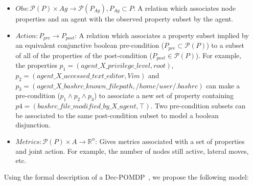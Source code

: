 \documentclass[conference]{IEEEtran}
\begin{document}
\begin{itemize}
    \item $Obs: \mathcal{P}(P) \times Ag \rightarrow \mathcal{P}(P_{Ag}), P_{Ag} \subset P$: A relation which associates node properties and an agent with the observed property subset by the agent.

    \item $Action: P_{pre} \rightarrow P_{post}$: A relation which associates a property subset implied by an equivalent conjunctive boolean pre-condition ($P_{pre} \subset \mathcal{P}(P)$) to a subset of all of the properties of the post-condition ($P_{post} \in \mathcal{P}(P)$). For example, the properties $p_1 = (agent\_X\_privilege\_level, \allowbreak root)$, $p_2 = (agent\_X\_accessed\_text\_editor, \allowbreak Vim)$ and $p_3 = (agent\_X\_bashrc\_known\_filepath, \allowbreak /home/user/.bashrc)$ can make a pre-condition ($p_1 \land p_2 \land p_3$) to associate a new set of property containing $p4 = (bashrc\_file\_modified\_by\_X\_agent, \top)$. Two pre-condition subsets can be associated to the same post-condition subset to model a boolean disjunction.

    \item $Metrics: \mathcal{P}(P) \times A \rightarrow \mathbb{R}^{n}$: Gives metrics associated with a set of properties and joint action. For example, the number of nodes still active, lateral moves, etc.

\end{itemize}


Using the formal description of a Dec-POMDP~\cite{OliehoekA16}, we propose the following model:
\end{document}
